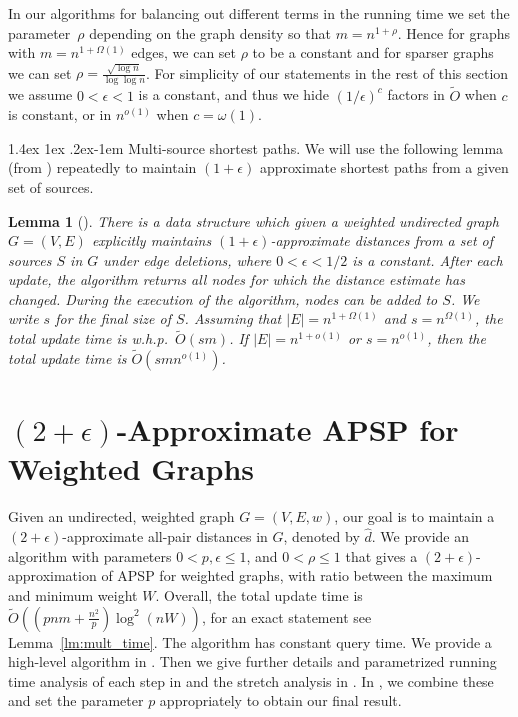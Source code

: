 \documentclass[11pt]{article}
\makeatletter
\newtheorem{lemma}[theorem]{Lemma}
\theoremstyle{definition}
\theoremstyle{remark}
\renewcommand{\paragraph}{%
  \@startsection{paragraph}{4}%
  {\z@}{1.4ex \@plus 1ex \@minus .2ex}{-1em}%
  {\normalfont\normalsize\bfseries}%
}
\makeatother
\begin{document}
In our algorithms for balancing out different terms in the running time we set the parameter~$\rho$ depending on the graph density so that $m= n^{1+\rho}$. Hence for graphs with $m= n^{1+\Omega(1)}$ edges, we can set $\rho$ to be a constant and for sparser graphs we can set $\rho = \frac{\sqrt{\log n}}{\log \log n}$. For simplicity of our statements in the rest of this section we assume $0< \epsilon <1$ is a constant, and thus we hide $(1/\epsilon)^c$ factors in $\tilde{O}$ when $c$ is constant, or in $n^{o(1)}$ when $c=\omega(1)$.



\paragraph{Multi-source shortest paths.}
We will use the following lemma (from \cite{LN2020}) repeatedly to maintain $(1+\epsilon)$ approximate shortest paths from a given set of sources. 

\begin{lemma}[\cite{LN2020}]\label{lm:decr_MSSP}
    There is a data structure which given a weighted undirected graph $G = (V, E)$ explicitly maintains $(1+\epsilon)$-approximate distances from a set of sources $S$ in $G$ under edge deletions, where $0<\epsilon< 1/2$ is a constant. After each update, the algorithm returns all nodes for which the distance estimate has changed. 
    During the execution of the algorithm, nodes can be added to $S$. We write $s$ for the final size of $S$. 
    Assuming that $|E| = n^{1+\Omega(1)}$ and $s = n^{\Omega(1)}$, the total update time is w.h.p.~$\tilde O(sm)$. If $|E| = n^{1+o(1)}$ or $s= n^{o(1)}$, then the total update time is $\tilde O(smn^{o(1)})$. 
\end{lemma}


\section{\texorpdfstring{$(2+\epsilon)$}{(2+epsilon)}-Approximate APSP for Weighted Graphs}\label{sec:TZ_2+eps}
Given an undirected, weighted graph $G=(V,E,w)$, our goal is to maintain a $(2+\epsilon)$-approximate all-pair distances in $G$, denoted by $\hat{d}$. 
We provide an algorithm \DynAPSPtwo with parameters $ 0< p,\epsilon\leq 1 $, and $0< \rho \leq 1$ that gives a $(2+\epsilon)$-approximation of APSP for weighted graphs, with ratio between the maximum and minimum weight $W$. Overall, the total update time is $\tilde{O}((pnm + \tfrac{n^2}{p}) \log^2 (nW))$, for an exact statement see Lemma~\ref{lm:mult_time}. The algorithm has constant query time. We provide a high-level algorithm in . Then we give further details and parametrized running time analysis of each step in  and the stretch analysis in . In , we combine these and set the parameter $p$ appropriately to obtain our final result. 
 
\end{document}
